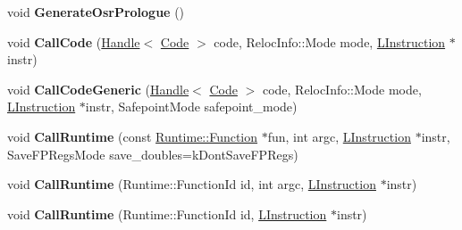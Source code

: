 \begin{DoxyCompactItemize}
\item 
void {\bfseries Generate\+Osr\+Prologue} ()\hypertarget{classv8_1_1internal_1_1_l_code_gen_a911d24be4ac4e392d736d9769b7ebb8f}{}\label{classv8_1_1internal_1_1_l_code_gen_a911d24be4ac4e392d736d9769b7ebb8f}

\item 
void {\bfseries Call\+Code} (\hyperlink{classv8_1_1internal_1_1_handle}{Handle}$<$ \hyperlink{classv8_1_1internal_1_1_code}{Code} $>$ code, Reloc\+Info\+::\+Mode mode, \hyperlink{classv8_1_1internal_1_1_l_instruction}{L\+Instruction} $\ast$instr)\hypertarget{classv8_1_1internal_1_1_l_code_gen_aca293066a99024759f94b995c6ba5ce5}{}\label{classv8_1_1internal_1_1_l_code_gen_aca293066a99024759f94b995c6ba5ce5}

\item 
void {\bfseries Call\+Code\+Generic} (\hyperlink{classv8_1_1internal_1_1_handle}{Handle}$<$ \hyperlink{classv8_1_1internal_1_1_code}{Code} $>$ code, Reloc\+Info\+::\+Mode mode, \hyperlink{classv8_1_1internal_1_1_l_instruction}{L\+Instruction} $\ast$instr, Safepoint\+Mode safepoint\+\_\+mode)\hypertarget{classv8_1_1internal_1_1_l_code_gen_a902e149712841134b7a31a866542b477}{}\label{classv8_1_1internal_1_1_l_code_gen_a902e149712841134b7a31a866542b477}

\item 
void {\bfseries Call\+Runtime} (const \hyperlink{structv8_1_1internal_1_1_runtime_1_1_function}{Runtime\+::\+Function} $\ast$fun, int argc, \hyperlink{classv8_1_1internal_1_1_l_instruction}{L\+Instruction} $\ast$instr, Save\+F\+P\+Regs\+Mode save\+\_\+doubles=k\+Dont\+Save\+F\+P\+Regs)\hypertarget{classv8_1_1internal_1_1_l_code_gen_a0667f2d6dadb8c8d199fff87298ae487}{}\label{classv8_1_1internal_1_1_l_code_gen_a0667f2d6dadb8c8d199fff87298ae487}

\item 
void {\bfseries Call\+Runtime} (Runtime\+::\+Function\+Id id, int argc, \hyperlink{classv8_1_1internal_1_1_l_instruction}{L\+Instruction} $\ast$instr)\hypertarget{classv8_1_1internal_1_1_l_code_gen_aa3ed1c0adfb39d573a164e1cafbf5f84}{}\label{classv8_1_1internal_1_1_l_code_gen_aa3ed1c0adfb39d573a164e1cafbf5f84}

\item 
void {\bfseries Call\+Runtime} (Runtime\+::\+Function\+Id id, \hyperlink{classv8_1_1internal_1_1_l_instruction}{L\+Instruction} $\ast$instr)\hypertarget{classv8_1_1internal_1_1_l_code_gen_a5a8eebd32428c2f6904e2875a4dbbb18}{}\label{classv8_1_1internal_1_1_l_code_gen_a5a8eebd32428c2f6904e2875a4dbbb18}


\end{DoxyCompactItemize}

